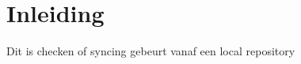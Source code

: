 \documentclass{article}
\begin{document}


\section{Inleiding}
Dit is checken of syncing gebeurt vanaf een local repository
\end{document}
